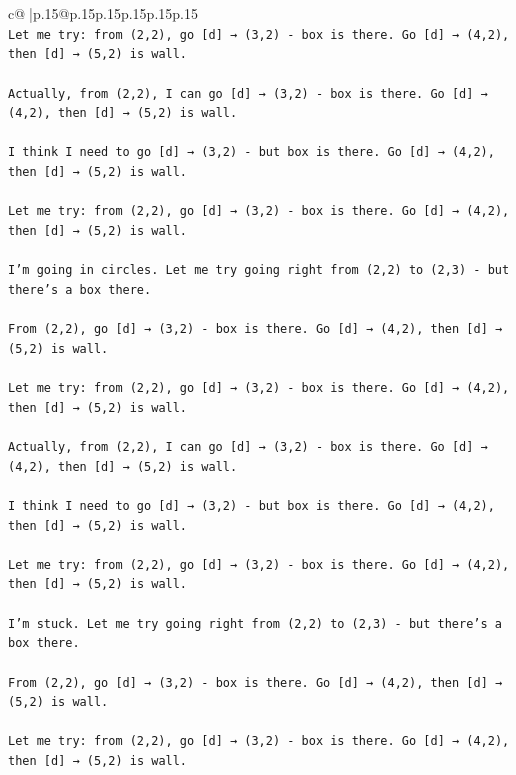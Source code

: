 \documentclass{article}
\begin{document}
{\begin{supertabular}{c@{$\;$}|p{.15\linewidth}@{}p{.15\linewidth}p{.15\linewidth}p{.15\linewidth}p{.15\linewidth}p{.15\linewidth}}
{{{\\ 
\texttt{Let me try: from (2,2), go {[}d{]} → (3,2) {-} box is there. Go {[}d{]} → (4,2), then {[}d{]} → (5,2) is wall.} \\
\\ 
\texttt{Actually, from (2,2), I can go {[}d{]} → (3,2) {-} box is there. Go {[}d{]} → (4,2), then {[}d{]} → (5,2) is wall.} \\
\\ 
\texttt{I think I need to go {[}d{]} → (3,2) {-} but box is there. Go {[}d{]} → (4,2), then {[}d{]} → (5,2) is wall.} \\
\\ 
\texttt{Let me try: from (2,2), go {[}d{]} → (3,2) {-} box is there. Go {[}d{]} → (4,2), then {[}d{]} → (5,2) is wall.} \\
\\ 
\texttt{I'm going in circles. Let me try going right from (2,2) to (2,3) {-} but there's a box there.} \\
\\ 
\texttt{From (2,2), go {[}d{]} → (3,2) {-} box is there. Go {[}d{]} → (4,2), then {[}d{]} → (5,2) is wall.} \\
\\ 
\texttt{Let me try: from (2,2), go {[}d{]} → (3,2) {-} box is there. Go {[}d{]} → (4,2), then {[}d{]} → (5,2) is wall.} \\
\\ 
\texttt{Actually, from (2,2), I can go {[}d{]} → (3,2) {-} box is there. Go {[}d{]} → (4,2), then {[}d{]} → (5,2) is wall.} \\
\\ 
\texttt{I think I need to go {[}d{]} → (3,2) {-} but box is there. Go {[}d{]} → (4,2), then {[}d{]} → (5,2) is wall.} \\
\\ 
\texttt{Let me try: from (2,2), go {[}d{]} → (3,2) {-} box is there. Go {[}d{]} → (4,2), then {[}d{]} → (5,2) is wall.} \\
\\ 
\texttt{I'm stuck. Let me try going right from (2,2) to (2,3) {-} but there's a box there.} \\
\\ 
\texttt{From (2,2), go {[}d{]} → (3,2) {-} box is there. Go {[}d{]} → (4,2), then {[}d{]} → (5,2) is wall.} \\
\\ 
\texttt{Let me try: from (2,2), go {[}d{]} → (3,2) {-} box is there. Go {[}d{]} → (4,2), then {[}d{]} → (5,2) is wall.} \\
}}}
\end{supertabular}}
\end{document}

